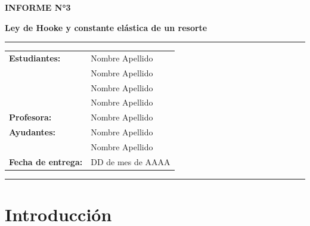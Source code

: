 \documentclass[12pt,a4paper]{article}
\begin{document}
\begin{center}
{\Large\textbf{INFORME N°3}}

{\LARGE\textbf{Ley de Hooke y constante elástica de un resorte}}

\rule{\textwidth}{0.5pt}

\begin{tabular}{ll}
    \textbf{Estudiantes:} & Nombre Apellido \\
                          & Nombre Apellido \\
                          & Nombre Apellido \\
                          & Nombre Apellido \\[0.2cm]
    \textbf{Profesora:}   & Nombre Apellido \\
    \textbf{Ayudantes:}    & Nombre Apellido \\
                           & Nombre Apellido\\[0.2cm]
    \textbf{Fecha de entrega:} & DD de mes de AAAA
\end{tabular}

\vspace{0.4cm}
\rule{\textwidth}{0.5pt}

\end{center}

\section{Introducción}
\end{document}
